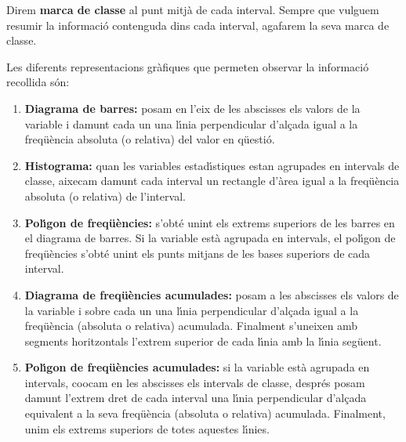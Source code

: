 Direm {\bf marca de classe} 
al punt mitj\`a de cada interval. Sempre que vulguem resumir la informaci\'o 
contenguda dins cada interval, agafarem la seva marca de
classe.

Les diferents representacions gr\`afiques 
que permeten observar 
la informaci\'o recollida s\'on:

\begin{enumerate}

\item {\bf Diagrama de barres:} 
posam en l'eix de les abscisses els valors de
la variable i damunt cada un una l\'{\i}nia perpendicular d'al\c cada igual a
la freq\"u\`encia absoluta (o relativa) del valor en q\"uesti\'o.

\item {\bf Histograma:} 
quan les variables estad\'{\i}stiques estan agrupades en
intervals de classe, aixecam damunt cada interval un rectangle d'\`area igual a
la freq\"u\`encia absoluta (o relativa) de l'interval.

\item {\bf Pol\'{\i}gon de freq\"u\`encies:} 
s'obt\'e unint els extrems superiors de les
barres en el diagrama de barres. 
Si la variable est\`a agrupada en 
intervals, el pol\'{\i}gon de freq\"u\`encies 
s'obt\'e unint els punts mitjans 
de les bases superiors de cada interval.

\item {\bf Diagrama de freq\"u\`encies acumulades:} 
posam a les abscisses els valors de la variable i sobre cada un una l\'{\i}nia perpendicular d'al\c cada
igual a la freq\"u\`encia (absoluta o relativa) acumulada. Finalment s'uneixen amb
segments horitzontals l'extrem superior de cada l\'{\i}nia amb la l\'{\i}nia seg\"uent.

\item {\bf Pol\'{\i}gon de freq\"u\`encies acumulades:} 
si la variable est\`a agrupada en
intervals, co{\lgem}ocam en les abscisses els intervals de classe,
 despr\'es posam
damunt l'extrem dret de cada interval una l\'{\i}nia perpendicular d'al\c{c}ada
equivalent a la seva freq\"u\`encia (absoluta o relativa) acumulada.
Finalment, unim els extrems superiors de totes aquestes l\'{\i}nies.
\end{enumerate}

